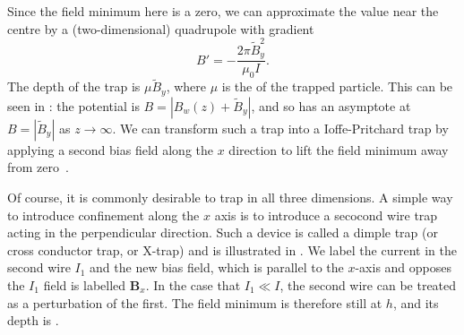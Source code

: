 Since the field minimum here is a zero, we can approximate the value near the
centre by a (two-dimensional) quadrupole with gradient
%
\begin{equation}
  B' = -\frac{2\pi \tilde{B}_y^2}{\mu_0 I}.
\end{equation}
%
The depth of the trap is $\mu \tilde{B}_y$, where $\mu$ is the  of the trapped particle. This can be seen in
: the potential is $B = |B_w(z) +
\tilde{B}_y|$, and so has an asymptote at $B=|\tilde{B}_y|$ as
$z\rightarrow\infty$.
%
We can transform such a trap into a Ioffe-Pritchard trap by applying a second
bias field along the $x$ direction to lift the field minimum away from
zero~\cite{2011Ac}.

Of course, it is commonly desirable to trap in all three dimensions. A simple
way to introduce confinement along the $x$ axis is to introduce a secocond wire
trap acting in the perpendicular direction. Such a device is called a dimple
trap (or cross conductor trap, or X-trap) and is illustrated in
. We label the current in the second wire $I_1$
and the new bias field, which is parallel to the $x$-axis and opposes the
$I_1$ field is labelled $\mathbf{B}_x$. In the case that $I_1 \ll I$, the
second wire can be treated as a perturbation of the first. The field minimum is
therefore still at $h$, and its depth is .

